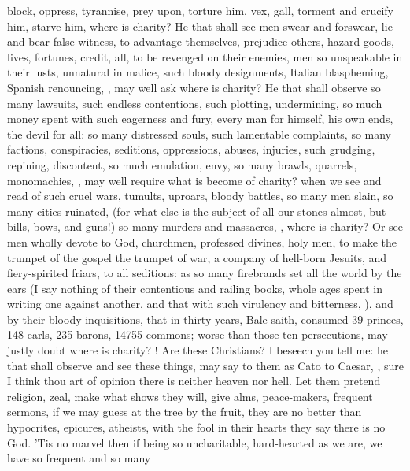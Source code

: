 {block, oppress, tyrannise, prey upon, torture him, vex, gall, torment
and crucify him, starve him, where is charity? He that shall see men
swear and forswear, lie and bear false witness, to advantage
themselves, prejudice others, hazard goods, lives, fortunes, credit,
all, to be revenged on their enemies, men so unspeakable in their
lusts, unnatural in malice, such bloody designments, Italian
blaspheming, Spanish renouncing, \etc{}, may well ask where is charity? He
that shall observe so many lawsuits, such endless contentions, such
plotting, undermining, so much money spent with such eagerness and
fury, every man for himself, his own ends, the devil for all: so many
distressed souls, such lamentable complaints, so many factions,
conspiracies, seditions, oppressions, abuses, injuries, such grudging,
repining, discontent, so much emulation, envy, so many brawls,
quarrels, monomachies, \etc{}, may well require what is become of charity?
when we see and read of such cruel wars, tumults, uproars, bloody
battles, so many men slain, so many cities ruinated, \etc{} (for
what else is the subject of all our stones almost, but bills, bows, and
guns!) so many murders and massacres, \etc{}, where is charity? Or see men
wholly devote to God, churchmen, professed divines, holy men, to
make the trumpet of the gospel the trumpet of war, a company of
hell-born Jesuits, and fiery-spirited friars,  to all
seditions: as so many firebrands set all the world by the ears (I say
nothing of their contentious and railing books, whole ages spent in
writing one against another, and that with such virulency and
bitterness, ), and by their bloody
inquisitions, that in thirty years, Bale saith, consumed 39 princes,
148 earls, 235 barons, 14\thinspace{}755 commons; worse than those ten
persecutions, may justly doubt where is charity? ! Are these Christians? I beseech you tell me: he that
shall observe and see these things, may say to them as Cato to Caesar,
, sure I think thou art
of opinion there is neither heaven nor hell. Let them pretend religion,
zeal, make what shows they will, give alms, peace-makers, frequent
sermons, if we may guess at the tree by the fruit, they are no better
than hypocrites, epicures, atheists, with the fool in their
hearts they say there is no God. 'Tis no marvel then if being so
uncharitable, hard-hearted as we are, we have so frequent and so many
}
